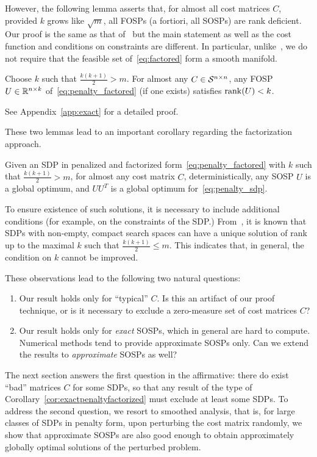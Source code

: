 However, the following lemma asserts that, for almost all cost matrices $C$, provided $k$ grows like $\sqrt{m}$, all FOSPs (a fortiori, all SOSPs) are rank deficient. Our proof is the same as that of~\citep[Lemma 9]{boumal2016non} but the main statement as well as the cost function and conditions on constraints are different. In particular, unlike~\cite{boumal2016non}, we do not require that the feasible set of~\eqref{eq:factored} form a smooth manifold. %
\begin{lemma}\label{lem:rank_deficient}
	Choose $k$ such that $\frac{k(k+1)}{2} > m$. For almost any $C \in \mathcal{S}^{n\times n}$, any FOSP $U \in \mathbb{R}^{n\times k}$ of~\eqref{eq:penalty_factored} (if one exists) satisfies $\operatorname{rank}(U) < k$.
\end{lemma}
See Appendix~\ref{app:exact} for a detailed proof. 

These two lemmas lead to an important corollary regarding the factorization approach.
\begin{corollary} \label{cor:exactpenaltyfactorized}
	Given an SDP in penalized and factorized form~\eqref{eq:penalty_factored} with $k$ such that $\frac{k(k+1)}{2} > m$, for almost any cost matrix $C$, deterministically, any SOSP $U$ is a global optimum, and $UU^T$ is a global optimum for~\eqref{eq:penalty_sdp}.
\end{corollary}
To ensure existence of such solutions, it is necessary to include additional conditions (for example, on the constraints of the SDP.) From~\citep{pataki1998rank,barvinok1995problems}, it is known that SDPs with non-empty, compact search spaces can have a unique solution of rank up to the maximal $k$ such that $\frac{k(k+1)}{2} \leq m$. This indicates that, in general, the condition on $k$ cannot be improved. 

These observations lead to the following two natural questions: 
\begin{enumerate}
	\item Our result holds only for ``typical'' $C$. Is this an artifact of our proof technique, or is it necessary to exclude a zero-measure set of cost matrices $C$?
	\item Our result holds only for \emph{exact} SOSPs, which in general are hard to compute. Numerical methods tend to provide approximate SOSPs only. Can we extend the results to \emph{approximate} SOSPs as well?
\end{enumerate}
The next section answers the first question in the affirmative: there do exist ``bad'' matrices $C$ for some SDPs, so that any result of the type of Corollary~\ref{cor:exactpenaltyfactorized} must exclude at least some SDPs. To address the second question, we resort to smoothed analysis, that is, for large classes of SDPs in penalty form, upon perturbing the cost matrix randomly, we show that approximate SOSPs are also good enough to obtain approximately globally optimal solutions of the perturbed problem. %